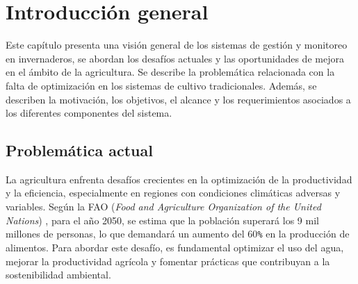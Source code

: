 
\chapter{Introducción general} %

\label{Chapter1} %
\label{IntroGeneral}

Este capítulo presenta una visión general de los sistemas de gestión y
monitoreo en invernaderos, se abordan los desafíos actuales y las oportunidades
de mejora en el ámbito de la agricultura. Se describe la problemática
relacionada con la falta de optimización en los sistemas de cultivo
tradicionales. Además, se describen la motivación, los objetivos, el alcance y
los requerimientos asociados a los diferentes componentes del sistema.


\newcommand{\keyword}[1]{\textbf{#1}}
\newcommand{\tabhead}[1]{\textbf{#1}}
\newcommand{\code}[1]{\texttt{#1}}
\newcommand{\file}[1]{\texttt{\bfseries#1}}
\newcommand{\option}[1]{\texttt{\itshape#1}}
\newcommand{\grados}{$^{\circ}$}



\section{Problemática actual}

La agricultura enfrenta desafíos crecientes en la optimización de la
productividad y la eficiencia, especialmente en regiones con condiciones
climáticas adversas y variables. Según la FAO (\textit{Food and Agriculture
      Organization of the United Nations}) \cite{GAPReport2016}, para el año 2050, se
estima que la población superará los 9 mil millones de personas, lo que
demandará un aumento del 60\code{\%} en la producción de alimentos. Para
abordar este desafío, es fundamental optimizar el uso del agua, mejorar la
productividad agrícola y fomentar prácticas que contribuyan a la sostenibilidad
ambiental.

